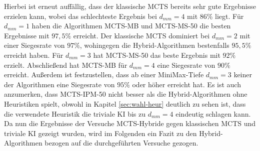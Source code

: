 \documentclass[12pt,a4paper,bibliography=totocnumbered,listof=totocnumbered]{article}
\begin{document}
Hierbei ist erneut auffällig, dass der klassische MCTS bereits sehr gute Ergebnisse erzielen kann, wobei das schlechteste Ergebnis bei $d_{mm}=4$ mit 86\% liegt. Für $d_{mm}=1$ haben die Algorithmen MCTS-MB und MCTS-MS-50 die besten Ergebnisse mit $97,5\%$ erreicht. Der klassische MCTS dominiert bei $d_{mm}=2$ mit einer Siegesrate von $97\%$, wohingegen die Hybrid-Algorithmen bestenfalls $95,5\%$ erreicht haben. Für $d_{mm}=3$ hat MCTS-MS-50 das beste Ergebnis mit $92\%$ erzielt. Abschließend hat MCTS-MB für $d_{mm}=4$ eine Siegesrate von $90\%$ erreicht. Außerdem ist festzustellen, dass ab einer MiniMax-Tiefe $d_{mm}=3$ keiner der Algorithmen eine Siegesrate von $95\%$ oder höher erreicht hat. Es ist auch anzumerken, dass MCTS-IPM-50 nicht besser als die Hybrid-Algorithmen ohne Heuristiken spielt, obwohl in Kapitel \ref{sec:wahl-heur} deutlich zu sehen ist, dass die verwendete Heuristik die triviale KI bis zu $d_{mm}=4$ eindeutig schlagen kann.\\
Da nun die Ergebnisse der Versuche MCTS-Hybride gegen klassischen MCTS und triviale KI gezeigt wurden, wird im Folgenden ein Fazit zu den Hybrid-Algorithmen bezogen auf die durchgeführten Versuche gezogen.
\end{document}

